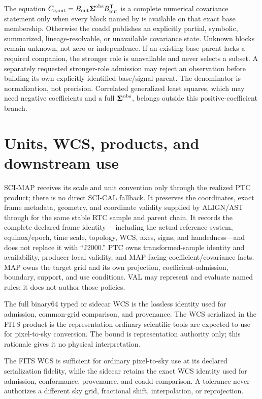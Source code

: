 \documentclass[10pt]{article}
\begin{document}
The equation
\(C_{c,{\rm out}}=B_{\rm out}\boldsymbol\Sigma^{\rm obs}B_{\rm out}^{\mathsf T}\)
is a complete numerical covariance statement only when every block named by
\SCIMapCovarianceCoaddRole{} is available on that exact base membership. Otherwise the coadd
publishes an explicitly partial, symbolic, summarized, lineage-resolvable, or
unavailable covariance state. Unknown blocks remain unknown, not zero or
independence. If an existing base parent lacks a required companion, the
stronger role is unavailable and never selects a subset. A separately
requested stronger-role admission may reject an observation before building
its own explicitly identified base/signal parent. The denominator is normalization,
not precision. Correlated generalized least squares, which may
need negative coefficients and a full \(\boldsymbol\Sigma^{\rm obs}\), belongs
outside this positive-coefficient branch.

\clearpage
\section{Units, WCS, products, and downstream use}\label{sec:products}
SCI-MAP receives its scale and unit convention only through the realized PTC
product; there is no direct SCI-CAL fallback. It preserves the coordinates,
exact frame metadata, geometry, and coordinate validity supplied by ALIGN/AST
through \SCIMapASTRTCGridProfile{} for the same stable RTC
sample and parent chain. It records the complete declared frame identity---
including the actual reference system, equinox/epoch, time scale, topology,
WCS, axes, signs, and handedness---and does not replace it with ``J2000.'' PTC
owns transformed-sample identity and availability, producer-local validity,
and MAP-facing coefficient/covariance facts. MAP owns the target grid and its
own projection, coefficient-admission, boundary, support, and use conditions.
VAL may represent and evaluate named rules; it does not author those policies.

The full binary64 typed or sidecar WCS is the lossless identity used
for admission, common-grid comparison, and provenance. The WCS serialized in
the FITS product is the representation ordinary scientific tools are expected
to use for pixel-to-sky conversion. \SCIMapWCSComparisonDefinition{} The bound
is representation authority only; this rationale gives it no physical
interpretation.

The FITS WCS is sufficient for ordinary pixel-to-sky use at its declared
serialization fidelity, while the sidecar retains the exact WCS identity used
for admission, conformance, provenance, and coadd comparison. A tolerance
never authorizes a different sky grid, fractional shift, interpolation, or
reprojection.
\end{document}

